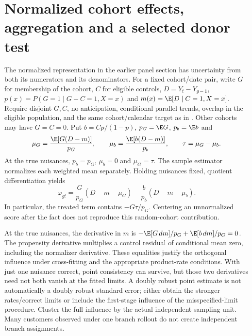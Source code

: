 \section{Normalized cohort effects, aggregation and a selected donor test}
\label{s6:panel-influence}
The normalized representation in the earlier panel section has uncertainty
from both its numerators and its denominators. For a fixed cohort/date pair,
write $G$ for membership of the cohort, $C$ for eligible controls,
$D=Y_t-Y_{g-1}$, $p(x)=P(G=1\mid G+C=1,X=x)$ and
$m(x)=\E[D\mid C=1,X=x]$. Require disjoint $G,C$, no anticipation,
conditional parallel trends, overlap in the eligible population, and the
same cohort/calendar target as in \citet{callaway2021}. Other cohorts may
have $G=C=0$. Put $b=Cp/(1-p)$, $p_G=\E G$, $p_b=\E b$ and
\[
 \mu_G=\frac{\E[G(D-m)]}{p_G},\qquad
 \mu_b=\frac{\E[b(D-m)]}{p_b},\qquad \tau=\mu_G-\mu_b.
\]
At the true nuisances, $p_b=p_G$, $\mu_b=0$ and $\mu_G=\tau$.
The sample estimator normalizes each weighted mean separately. Holding
nuisances fixed, quotient differentiation yields
\begin{equation}
 \varphi_{gt}=
 \frac{G}{p_G}(D-m-\mu_G)
 -\frac{b}{p_b}(D-m-\mu_b).
 \label{s6:att-if}
\end{equation}
In particular, the treated term contains $-G\tau/p_G$. Centering an
unnormalized score after the fact does not reproduce this random-cohort
contribution.

At the true nuisances, the derivative in $m$ is
$-\E[G\,dm]/p_G+\E[b\,dm]/p_G=0$. The propensity derivative
multiplies a control residual of conditional mean zero, including the
normalizer derivative. These equalities justify the orthogonal influence
under cross-fitting and the appropriate product-rate conditions. With just
one nuisance correct, point consistency can survive, but those two
derivatives need not both vanish at the fitted limits. A doubly robust point
estimate is not automatically a doubly robust standard error; either obtain
the stronger rates/correct limits or include the first-stage influence of
the misspecified-limit procedure. Cluster the full influence by the actual
independent sampling unit. Many customers observed under one branch rollout
do not create independent branch assignments.


